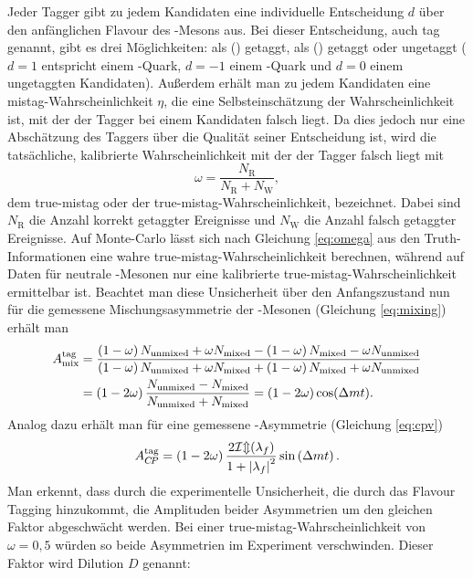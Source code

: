 Jeder Tagger gibt zu jedem Kandidaten eine individuelle Entscheidung $d$ über den anfänglichen Flavour des \B-Mesons aus. Bei dieser Entscheidung, auch tag genannt, gibt es drei Möglichkeiten: als \Bz (\bquarkbar\dquark) getaggt, als \Bzb (\bquark\dquarkbar) getaggt oder ungetaggt ($d=1$ entspricht einem \bquarkbar-Quark, $d=-1$ einem \bquark-Quark und $d=0$ einem ungetaggten Kandidaten). Außerdem erhält man zu jedem Kandidaten eine mistag-Wahrscheinlichkeit $\eta$, die eine Selbsteinschätzung der Wahrscheinlichkeit ist, mit der der Tagger bei einem Kandidaten falsch liegt. Da dies jedoch nur eine Abschätzung des Taggers über die Qualität seiner Entscheidung ist, wird die tatsächliche, kalibrierte Wahrscheinlichkeit mit der der Tagger falsch liegt mit 
\begin{equation}
\omega=\frac{N_{\text{R}}}{N_{\text{R}}+N_{\text{W}}}\label{eq:omega},
\end{equation}
dem true-mistag oder der true-mistag-Wahrscheinlichkeit, bezeichnet. Dabei sind $N_{\text{R}}$ die Anzahl korrekt getaggter Ereignisse und $N_{\text{W}}$ die Anzahl falsch getaggter Ereignisse. Auf Monte-Carlo lässt sich nach Gleichung \eqref{eq:omega} aus den Truth-Informationen eine wahre true-mistag-Wahrscheinlichkeit berechnen, während auf Daten für neutrale \B-Mesonen nur eine kalibrierte true-mistag-Wahrscheinlichkeit ermittelbar ist. Beachtet man diese Unsicherheit über den Anfangszustand nun für die gemessene Mischungsasymmetrie der \B-Mesonen (Gleichung \eqref{eq:mixing}) erhält man
\begin{equation}
\begin{split}
A_{\text{mix}}^{\text{tag}}&=\frac{\left(1-\omega\right)N_\text{unmixed}+\omega N_\text{mixed}-\left(1-\omega\right)N_\text{mixed}-\omega N_\text{unmixed}}{\left(1-\omega\right)N_\text{unmixed}+\omega N_\text{mixed}+\left(1-\omega\right)N_\text{mixed}+\omega N_\text{unmixed}}\\
&=\left(1-2\omega\right)\frac{N_\text{unmixed}-N_\text{mixed}}{N_\text{unmixed}+N_\text{mixed}}=\left(1-2\omega\right)\cos({\Delta m} t).\label{eq:mischung}
\end{split}
\end{equation}
Analog dazu erhält man für eine gemessene \CP-Asymmetrie (Gleichung \eqref{eq:cpv})
\begin{equation}
A_{C\!P}^{\text{tag}}=\left(1-2\omega\right)\frac{2\mathcal{Im}(\lambda_f)}{1+\left|\lambda_f\right|^2}\sin\left({\Delta m} t\right).
\end{equation}
Man erkennt, dass durch die experimentelle Unsicherheit, die durch das Flavour Tagging hinzukommt, die Amplituden beider Asymmetrien um den gleichen Faktor abgeschwächt werden. Bei einer true-mistag-Wahrscheinlichkeit von $\omega=0{,}5$ würden so beide Asymmetrien im Experiment verschwinden. Dieser Faktor wird Dilution $D$ genannt: 
